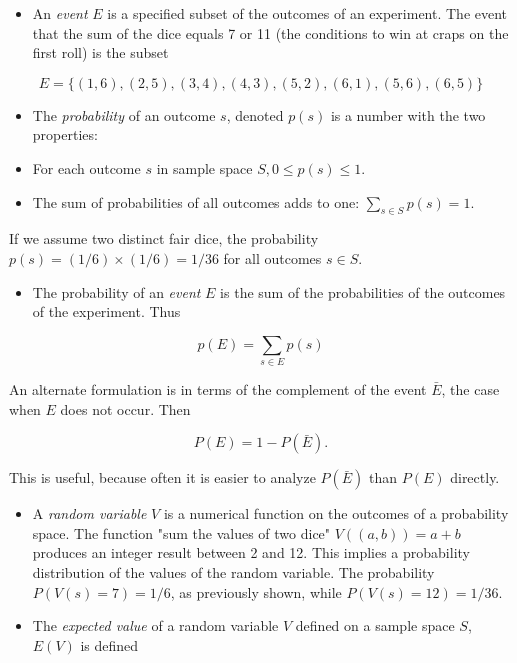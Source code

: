 \documentclass[10pt]{article}
\begin{document}
\begin{itemize}
  \item An \textit{event} $E$ is a specified subset of the outcomes of an experiment. The event that the sum of the dice equals 7 or 11 (the conditions to win at craps on the first roll) is the subset
\end{itemize}

\[
E=\{(1,6),(2,5),(3,4),(4,3),(5,2),(6,1),(5,6),(6,5)\}
\]

\begin{itemize}
  \item The \textit{probability} of an outcome $s$, denoted $p(s)$ is a number with the two properties:
  \item For each outcome $s$ in sample space $S, 0 \leq p(s) \leq 1$.
  \item The sum of probabilities of all outcomes adds to one: \(\sum_{s \in S} p(s)=1\).
\end{itemize}

If we assume two distinct fair dice, the probability \(p(s)=(1 / 6) \times(1 / 6)=1 / 36\) for all outcomes \(s \in S\).

\begin{itemize}
  \item The probability of an \textit{event} $E$ is the sum of the probabilities of the outcomes of the experiment. Thus
\end{itemize}

\[
p(E)=\sum_{s \in E} p(s)
\]

An alternate formulation is in terms of the complement of the event \(\bar{E}\), the case when $E$ does not occur. Then

\[
P(E)=1-P(\bar{E}) .
\]

This is useful, because often it is easier to analyze \(P(\bar{E})\) than \(P(E)\) directly.

\begin{itemize}
  \item A \textit{random variable} $V$ is a numerical function on the outcomes of a probability space. The function "sum the values of two dice" \(V((a, b))=a+b\) produces an integer result between 2 and 12. This implies a probability distribution of the values of the random variable. The probability \(P(V(s)=7)=1 / 6\), as previously shown, while \(P(V(s)=12)=1 / 36\).
  \item The \textit{expected value} of a random variable \(V\) defined on a sample space \(S\), \(E(V)\) is defined
\end{itemize}
\end{document}
